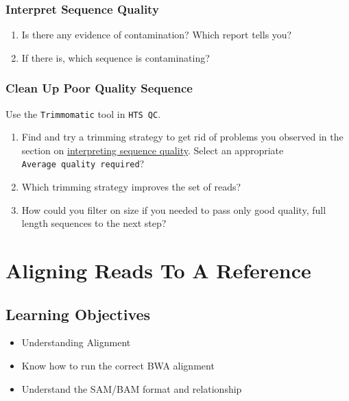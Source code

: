 \documentclass[12pt,]{book}
\providecommand{\tightlist}{%
  \setlength{\itemsep}{0pt}\setlength{\parskip}{0pt}}
\begin{document}
\hypertarget{qualprac}{\subsection{Interpret Sequence
Quality}\label{qualprac}}

\begin{enumerate}
\def\labelenumi{\arabic{enumi}.}
\tightlist
\item
  Is there any evidence of contamination? Which report tells you?
\item
  If there is, which sequence is contaminating?
\end{enumerate}

\subsection{Clean Up Poor Quality
Sequence}\label{clean-up-poor-quality-sequence}

Use the \texttt{Trimmomatic} tool in \texttt{HTS\ QC}.

\begin{enumerate}
\def\labelenumi{\arabic{enumi}.}
\tightlist
\item
  Find and try a trimming strategy to get rid of problems you observed
  in the section on \protect\hyperlink{qualprac}{interpreting sequence
  quality}. Select an appropriate \texttt{Average\ quality\ required}?
\item
  Which trimming strategy improves the set of reads?
\item
  How could you filter on size if you needed to pass only good quality,
  full length sequences to the next step?
\end{enumerate}

\chapter{Aligning Reads To A
Reference}\label{aligning-reads-to-a-reference}

\section{Learning Objectives}\label{learning-objectives-2}

\begin{itemize}
\tightlist
\item
  Understanding Alignment
\item
  Know how to run the correct BWA alignment
\item
  Understand the SAM/BAM format and relationship
\end{itemize}
\end{document}

